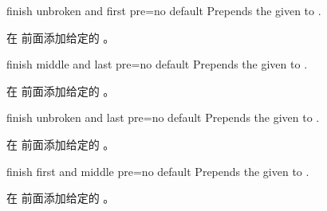 \begin{docTcbKey}{finish unbroken and first pre}{=}{no default}
Prepends the given  to .

在  前面添加给定的 。
\end{docTcbKey}

\begin{docTcbKey}{finish middle and last pre}{=}{no default}
Prepends the given  to .

在  前面添加给定的 。
\end{docTcbKey}

\begin{docTcbKey}{finish unbroken and last pre}{=}{no default}
Prepends the given  to .

在  前面添加给定的 。
\end{docTcbKey}

\begin{docTcbKey}[][doc new=2014-09-19]{finish first and middle pre}{=}{no default}
Prepends the given  to .

在  前面添加给定的 。
\end{docTcbKey}